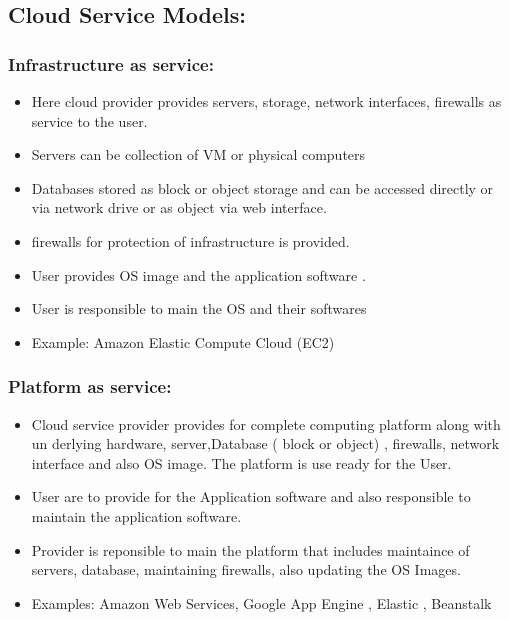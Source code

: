 \documentclass[11pt]{article}
\begin{document}
\subsection{Cloud Service Models:}
\label{sec:orgab7c08f}

\subsubsection{Infrastructure as service:}
\label{sec:orgba2c813}
\begin{itemize}
\item Here cloud provider provides servers, storage, network interfaces, firewalls
as service to the user.
\item Servers can be collection of VM or physical computers
\item Databases stored as block or object storage and  can be accessed directly
or via network drive  or as object via web interface.
\item firewalls for protection of infrastructure is provided.
\item User provides OS image and the application software .
\item User is responsible to main the OS and their softwares
\item Example: Amazon Elastic Compute Cloud (EC2)
\end{itemize}

\subsubsection{Platform as service:}
\label{sec:orga78936a}
\begin{itemize}
\item Cloud service provider provides for complete computing platform along with un
derlying hardware, server,Database ( block or object) , firewalls, network interface
and also OS image. The platform is use ready for the User.
\item User are to provide for the Application software and also responsible to
maintain the application software.
\item Provider is reponsible to main the platform that includes maintaince of servers,
database, maintaining firewalls, also updating the OS Images.
\item Examples: Amazon Web Services, Google App Engine , Elastic , Beanstalk
\end{itemize}
\end{document}
